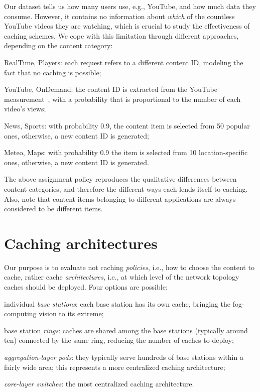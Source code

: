 \documentclass{sig-alternate-05-2015}
\let\tempone\itemize
\let\temptwo\enditemize
\renewenvironment{itemize}{\tempone\addtolength{\itemsep}{-0.7\baselineskip}}{\temptwo}
\begin{document}
Our dataset tells us how many users use, e.g., YouTube, and how much data they consume. However, it contains no information about {\em which} of the countless YouTube videos they are watching, which is crucial to study the effectiveness of caching schemes.
We cope with this limitation through different approaches, depending on the content category:
\begin{itemize}
\item RealTime, Players: each request refers to a different content ID, modeling the fact that no caching is possible;
\item YouTube, OnDemand: the content ID is extracted from the YouTube
  measurement~\cite{youtube}, with a probability that is proportional
  to the number of each video's views;
\item News, Sports: with probability 0.9, the content item is selected
  from 50 popular ones, otherwise, a new content ID is generated;
\item Meteo, Maps: with probability 0.9 the item is selected from 10
  location-specific ones, otherwise, a new content ID is generated.

\end{itemize}
The above assignment policy reproduces the qualitative differences
between content categories, and therefore the different ways each
lends itself to caching. Also, note that content items belonging to
different applications are always considered to be different items.

\section{Caching architectures}
\label{sec:caching}

Our purpose is to evaluate not caching {\em policies}, i.e., how to choose the content to cache, rather cache {\em architectures}, i.e., at which level of the network topology caches should be deployed.
Four options are possible:
\begin{itemize}
\item individual {\em base stations}: each base station has its own cache, bringing the fog-computing vision to its extreme;
\item base station {\em rings}: caches are shared among the base stations (typically around ten) connected by the same ring, reducing the number of caches to deploy;
\item {\em aggregation-layer pods}: they typically serve hundreds of base stations within a fairly wide area; this represents a more centralized caching architecture;
\item {\em core-layer switches}: the most centralized caching architecture.
\end{itemize}
\end{document}
